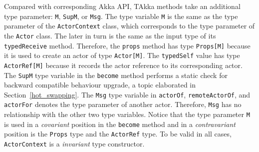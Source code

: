 Compared with corresponding Akka API, TAkka methods take an additional type 
parameter: {\tt M}, {\tt SupM}, or {\tt Msg}.  The type variable {\tt M} is
the same as the type parameter of the {\tt ActorContext} class, which corresponds
to the type parameter of the {\tt Actor} class.  The later in turn is the same
as the input type of its {\tt typedReceive} method.  Therefore, the {\tt props}
method has type {\tt Props[M]} because it is used to create an actor of type {\tt Actor[M]}.
The {\tt typedSelf} value has type {\tt ActorRef[M]} because it records the 
actor reference to its corresponding actor.  The {\tt SupM} type variable in the
{\tt become} method performs a static check for backward compatible behaviour
upgrade, a topic elaborated in Section~\ref{hot_swapping}.  
The {\tt Msg} type variable in {\tt actorOf}, {\tt remoteActorOf}, and {\tt actorFor}
denotes the type parameter of another actor.  Therefore, {\tt Msg} has no
relationship with the other two type variables.  Notice that the type
parameter {\tt M} is used in a {\it covariant} position in the {\tt become} method
and in a {\it contravariant} position is the {\tt Props} type and the {\tt ActorRef} type.
To be valid in all cases, {\tt ActorContext} is a {\it invariant} type constructor.





